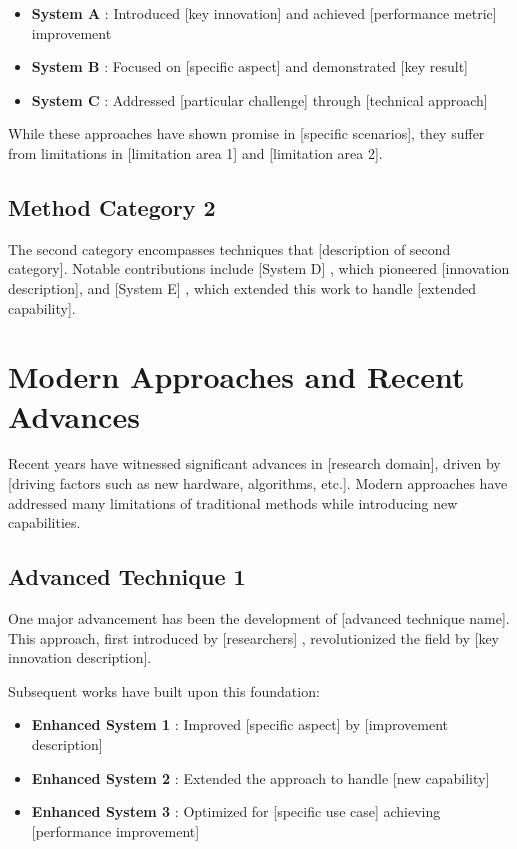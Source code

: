 \begin{itemize}
    \item \textbf{System A} \cite{example-reference-8}: Introduced [key innovation] and achieved [performance metric] improvement
    \item \textbf{System B} \cite{example-reference-9}: Focused on [specific aspect] and demonstrated [key result]
    \item \textbf{System C} \cite{example-reference-10}: Addressed [particular challenge] through [technical approach]
\end{itemize}

While these approaches have shown promise in [specific scenarios], they suffer from limitations in [limitation area 1] and [limitation area 2].

\subsection{Method Category 2}

The second category encompasses techniques that [description of second category]. Notable contributions include [System D] \cite{example-reference-11}, which pioneered [innovation description], and [System E] \cite{example-reference-12}, which extended this work to handle [extended capability].

\lipsum[2]

\section{Modern Approaches and Recent Advances}

Recent years have witnessed significant advances in [research domain], driven by [driving factors such as new hardware, algorithms, etc.]. Modern approaches have addressed many limitations of traditional methods while introducing new capabilities.

\subsection{Advanced Technique 1}

One major advancement has been the development of [advanced technique name]. This approach, first introduced by [researchers] \cite{example-reference-13}, revolutionized the field by [key innovation description].

Subsequent works have built upon this foundation:
\begin{itemize}
    \item \textbf{Enhanced System 1} \cite{example-reference-14}: Improved [specific aspect] by [improvement description]
    \item \textbf{Enhanced System 2} \cite{example-reference-15}: Extended the approach to handle [new capability]
    \item \textbf{Enhanced System 3} \cite{example-reference-16}: Optimized for [specific use case] achieving [performance improvement]
\end{itemize}

